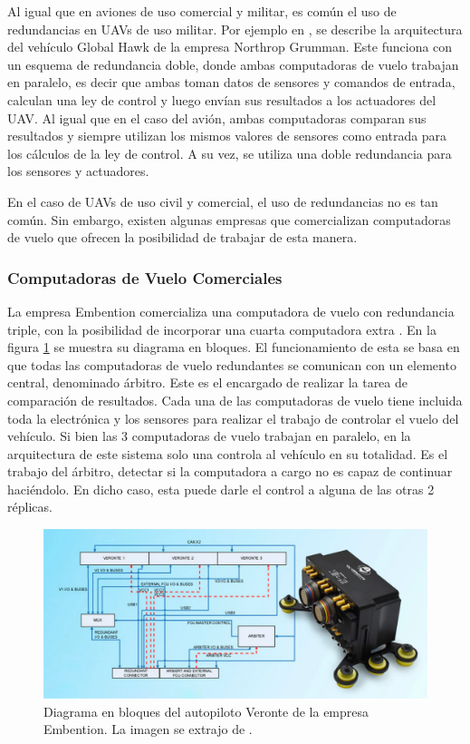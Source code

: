 Al igual que en aviones de uso comercial y militar, es común el uso de redundancias en UAVs de uso militar. Por ejemplo en \cite{821966}, se describe la arquitectura del vehículo Global Hawk de la empresa Northrop Grumman. Este funciona con un esquema de redundancia doble, donde ambas computadoras de vuelo trabajan en paralelo, es decir que ambas toman datos de sensores y comandos de entrada, calculan una ley de control y luego envían sus resultados a los actuadores del UAV. Al igual que en el caso del avión, ambas computadoras comparan sus resultados y siempre utilizan los mismos valores de sensores como entrada para los cálculos de la ley de control. A su vez, se utiliza una doble redundancia para los sensores y actuadores.

En el caso de UAVs de uso civil y comercial, el uso de redundancias no es tan común. Sin embargo, existen algunas empresas que comercializan computadoras de vuelo que ofrecen la posibilidad de trabajar de esta manera. %

\subsubsection{Computadoras de Vuelo Comerciales}

La empresa Embention comercializa una computadora de vuelo con redundancia triple, con la posibilidad de incorporar una cuarta computadora extra \cite{embention-2023}. En la figura \ref{fig:Veronte_Embention} se muestra su diagrama en bloques. El funcionamiento de esta se basa en que todas las computadoras de vuelo redundantes se comunican con un elemento central, denominado árbitro. Este es el encargado de realizar la tarea de comparación de resultados. Cada una de las computadoras de vuelo tiene incluida toda la electrónica y los sensores para realizar el trabajo de controlar el vuelo del vehículo. Si bien las 3 computadoras de vuelo trabajan en paralelo, en la arquitectura de este sistema solo una controla al vehículo en su totalidad. Es el trabajo del árbitro, detectar si la computadora a cargo no es capaz de continuar haciéndolo. En dicho caso, esta puede darle el control a alguna de las otras 2 réplicas.

\begin{figure}[htb]
    \centering
    \includegraphics[width=\textwidth]{img/Veronte_Embention.png}
    \caption{Diagrama en bloques del autopiloto Veronte de la empresa Embention. La imagen se extrajo de \cite{embention-2023}.}
    \label{fig:Veronte_Embention}    
\end{figure}


